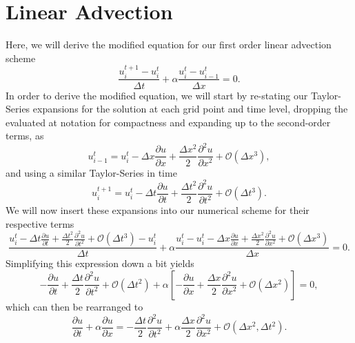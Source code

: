 \section{Linear Advection}
Here, we will derive the modified equation for our first order linear advection scheme
\begin{equation}
	\frac{u_i^{t+1} - u_{i}^t}{\Delta t} +  \alpha \frac{u_i^{t} - u_{i-1}^{t}}{\Delta x} = 0.
\end{equation}
In order to derive the modified equation, we will start by re-stating our Taylor-Series expansions for the solution at each grid point and time level, dropping the evaluated at notation for compactness and expanding up to the second-order terms, as
\begin{equation}
	u_{i-1}^t = u_i^t - \Delta x \frac{\partial u}{\partial x} + \frac{\Delta x^2}{2} \frac{\partial^2 u}{\partial x^2} + \mathcal{O}(\Delta x^3),
\end{equation}
and using a similar Taylor-Series in time
\begin{equation}
	u_{i}^{t+1} = u_i^t - \Delta t \frac{\partial u}{\partial t} + \frac{\Delta t^2}{2} \frac{\partial^2 u}{\partial t^2} + \mathcal{O}(\Delta t^3).
\end{equation}
We will now insert these expansions into our numerical scheme for their respective terms
\begin{equation}
	\frac{u_i^t - \Delta t \frac{\partial u}{\partial t} + \frac{\Delta t^2}{2} \frac{\partial^2 u}{\partial t^2} + \mathcal{O}(\Delta t^3) - u_{i}^t}{\Delta t} +  \alpha \frac{u_i^{t} - u_i^t - \Delta x \frac{\partial u}{\partial x} + \frac{\Delta x^2}{2} \frac{\partial^2 u}{\partial x^2} + \mathcal{O}(\Delta x^3)}{\Delta x} = 0.
\end{equation}
Simplifying this expression down a bit yields
\begin{equation}
	- \frac{\partial u}{\partial t} + \frac{\Delta t}{2} \frac{\partial^2 u}{\partial t^2} + \mathcal{O}(\Delta t^2) +  \alpha \left[ - \frac{\partial u}{\partial x} + \frac{\Delta x}{2} \frac{\partial^2 u}{\partial x^2} + \mathcal{O}(\Delta x^2) \right] = 0,
\end{equation}
which can then be rearranged to
\begin{equation}
	\label{eqn:38fg93la}
	\frac{\partial u}{\partial t} + \alpha \frac{\partial u}{\partial x} = -\frac{\Delta t}{2} \frac{\partial^2 u}{\partial t^2} + \alpha \frac{\Delta x}{2} \frac{\partial^2 u}{\partial x^2} + \mathcal{O}(\Delta x^2,\Delta t^2).
\end{equation}

